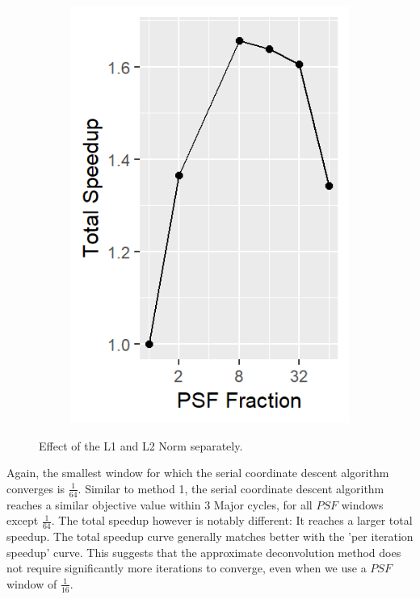 \begin{figure}[h]
\begin{subfigure}[b]{0.195\linewidth}
	\end{subfigure}
	\begin{subfigure}[b]{0.195\linewidth}
		\includegraphics[width=\linewidth]{./chapters/10.results/gradient/ApproxDeconv/speedup_total.png}
	\end{subfigure}
	
	\caption{Effect of the L1 and L2 Norm separately.}
	\label{results:gradients:aproxDeconv}
\end{figure}

Again, the smallest window for which the serial coordinate descent algorithm converges is $\frac{1}{64}$. Similar to method 1, the serial coordinate descent algorithm reaches a similar objective value within 3 Major cycles, for all $PSF$ windows except $\frac{1}{64}$. The total speedup however is notably different: It reaches a larger total speedup. The total speedup curve generally matches better with the 'per iteration speedup' curve. This suggests that the approximate deconvolution method does not require significantly more iterations to converge, even when we use a $PSF$ window of $\frac{1}{16}$. 

